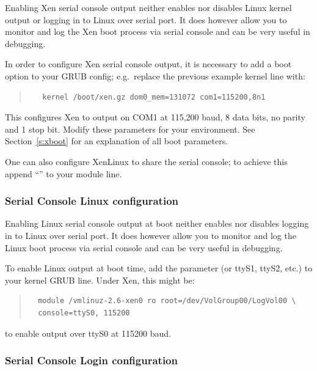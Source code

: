 \documentclass[11pt,twoside,final,openright]{report}
\begin{document}
Enabling Xen serial console output neither enables nor disables Linux
kernel output or logging in to Linux over serial port.  It does however
allow you to monitor and log the Xen boot process via serial console and
can be very useful in debugging.


In order to configure Xen serial console output, it is necessary to
add a boot option to your GRUB config; e.g.\ replace the previous
example kernel line with:
\begin{quote} {\small \begin{verbatim}
   kernel /boot/xen.gz dom0_mem=131072 com1=115200,8n1
\end{verbatim}}
\end{quote}

This configures Xen to output on COM1 at 115,200 baud, 8 data bits, no
parity and 1 stop bit. Modify these parameters for your environment.
See Section~\ref{s:xboot} for an explanation of all boot parameters.

One can also configure XenLinux to share the serial console; to achieve
this append ``'' to your module line.


\subsubsection{Serial Console Linux configuration}

Enabling Linux serial console output at boot neither enables nor
disables logging in to Linux over serial port.  It does however allow
you to monitor and log the Linux boot process via serial console and can be
very useful in debugging.

To enable Linux output at boot time, add the parameter
 (or ttyS1, ttyS2, etc.) to your kernel GRUB line.
Under Xen, this might be:
\begin{quote} 
{\footnotesize \begin{verbatim}
  module /vmlinuz-2.6-xen0 ro root=/dev/VolGroup00/LogVol00 \
  console=ttyS0, 115200
\end{verbatim}}
\end{quote}
to enable output over ttyS0 at 115200 baud.



\subsubsection{Serial Console Login configuration}
\end{document}
